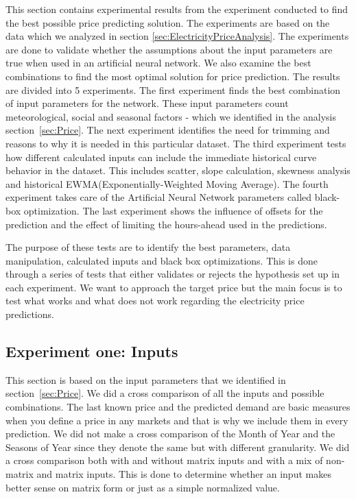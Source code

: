 This section contains experimental results from the experiment conducted to find the best possible price predicting solution. The experiments are based on the data which we analyzed in section \ref{sec:ElectricityPriceAnalysis}. The experiments are done to validate whether the assumptions about the input parameters are true when used in an artificial neural network. We also examine the best combinations to find the most optimal solution for price prediction. The results are divided into 5 experiments. The first experiment finds the best combination of input parameters for the network. These input parameters count meteorological, social and seasonal factors - which we identified in the analysis section~\ref{sec:Price}. The next experiment identifies the need for trimming and reasons to why it is needed in this particular dataset. The third experiment tests how different calculated inputs can include the immediate historical curve behavior in the dataset. This includes scatter, slope calculation, skewness analysis and historical EWMA(Exponentially-Weighted Moving Average). The fourth experiment takes care of the Artificial Neural Network parameters called black-box optimization. The last experiment shows the influence of offsets for the prediction and the effect of limiting the hours-ahead used in the predictions.

The purpose of these tests are to identify the best parameters, data manipulation, calculated inputs and black box optimizations. This is done through a series of tests that either validates or rejects the hypothesis set up in each experiment. We want to approach the target price but the main focus is to test what works and what does not work regarding the electricity price predictions. 


\subsection{Experiment one: Inputs}
\label{sec:priceExperimentOne}
This section is based on the input parameters that we identified in section~\ref{sec:Price}. We did a cross comparison of all the inputs and possible combinations. The last known price and the predicted demand are basic measures when you define a price in any markets and that is why we include them in every prediction. We did not make a cross comparison of the Month of Year and the Seasons of Year since they denote the same but with different granularity. We did a cross comparison both with and without matrix inputs and with a mix of non-matrix and matrix inputs. This is done to determine whether an input makes better sense on matrix form or just as a simple normalized value. 

